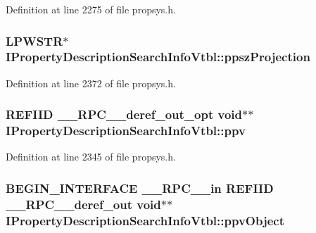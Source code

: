 Definition at line 2275 of file propsys.\+h.

\subsubsection[{\texorpdfstring{ppsz\+Projection}{ppszProjection}}]{ {\bf L\+P\+W\+S\+TR}$\ast$ I\+Property\+Description\+Search\+Info\+Vtbl\+::ppsz\+Projection}\hypertarget{struct_i_property_description_search_info_vtbl_a14a831280dfa674c055c0be852d05505}{}\label{struct_i_property_description_search_info_vtbl_a14a831280dfa674c055c0be852d05505}


Definition at line 2372 of file propsys.\+h.

\subsubsection[{\texorpdfstring{ppv}{ppv}}]{ {\bf R\+E\+F\+I\+ID} {\bf \+\_\+\+\_\+\+R\+P\+C\+\_\+\+\_\+deref\+\_\+out\+\_\+opt} {\bf void}$\ast$$\ast$ I\+Property\+Description\+Search\+Info\+Vtbl\+::ppv}\hypertarget{struct_i_property_description_search_info_vtbl_a99b1f8b3b9bb8d15ff879d2756b3db7b}{}\label{struct_i_property_description_search_info_vtbl_a99b1f8b3b9bb8d15ff879d2756b3db7b}


Definition at line 2345 of file propsys.\+h.

\subsubsection[{\texorpdfstring{ppv\+Object}{ppvObject}}]{\setlength{\rightskip}{0pt plus 5cm}B\+E\+G\+I\+N\+\_\+\+I\+N\+T\+E\+R\+F\+A\+CE {\bf \+\_\+\+\_\+\+R\+P\+C\+\_\+\+\_\+in} {\bf R\+E\+F\+I\+ID} {\bf \+\_\+\+\_\+\+R\+P\+C\+\_\+\+\_\+deref\+\_\+out} {\bf void}$\ast$$\ast$ I\+Property\+Description\+Search\+Info\+Vtbl\+::ppv\+Object}\hypertarget{struct_i_property_description_search_info_vtbl_acaf853b6f6a2348298013feb03050294}{}\label{struct_i_property_description_search_info_vtbl_acaf853b6f6a2348298013feb03050294}


